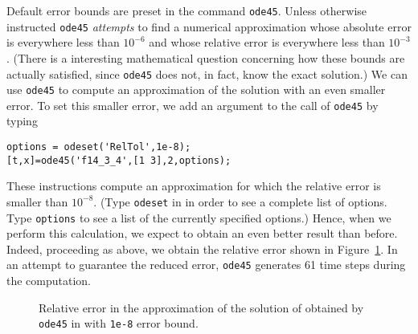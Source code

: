 \documentclass{ximera}
\begin{document}
Default error bounds are preset in the command {\tt ode45}.  Unless otherwise
instructed {\tt ode45} {\em attempts\/} to find a numerical approximation 
whose absolute error is everywhere less than $10^{-6}$ and whose relative 
error is everywhere less than $10^{-3}$.  (There is a interesting mathematical
question concerning how these bounds are actually satisfied, since 
{\tt ode45} does not, in fact, know the exact solution.)  We can use 
{\tt ode45} to compute an approximation of the solution with an even smaller 
error.  To set this smaller error, we add an argument to the call of 
{\tt ode45} by typing 
\begin{verbatim}
options = odeset('RelTol',1e-8);
[t,x]=ode45('f14_3_4',[1 3],2,options);
\end{verbatim}
These instructions compute an approximation for which the relative error 
 is smaller than $10^{-8}$.  
(Type {\tt odeset} in \Matlab in order to see a 
complete list of options. Type {\tt options} to see a list of the currently
specified options.)  Hence, when we perform 
this calculation, we expect to obtain an even better result than before.  
Indeed, proceeding as above, we obtain the relative error shown 
in Figure~\ref{fig:ode45err2}.  In an attempt to guarantee the reduced error, 
{\tt ode45} generates 61 time steps during the computation.  

\begin{figure}[htb]
   \centerline{%
   }
   \caption{Relative error in the approximation of the solution of
   \protect{} obtained by {\tt ode45} in \protect\Matlab with 
	{\tt 1e-8} error bound.}
   \label{fig:ode45err2}
\end{figure}

\EXER

\CEXER
\end{document}
